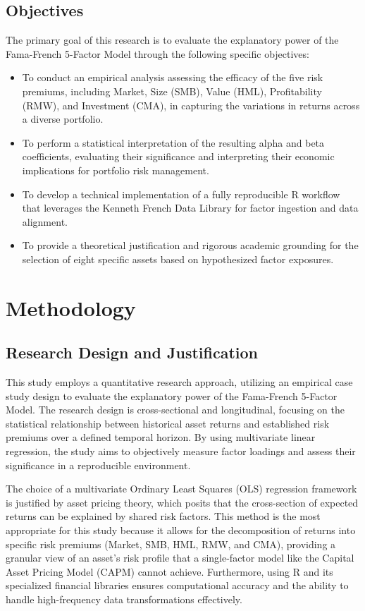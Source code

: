 \documentclass[12pt]{article}
\begin{document}
\subsection{Objectives}
The primary goal of this research is to evaluate the explanatory power of the Fama-French 5-Factor Model through the following specific objectives:
\begin{itemize}
    \item To conduct an empirical analysis assessing the efficacy of the five risk premiums, including Market, Size (SMB), Value (HML), Profitability (RMW), and Investment (CMA), in capturing the variations in returns across a diverse portfolio.
    \item To perform a statistical interpretation of the resulting alpha and beta coefficients, evaluating their significance and interpreting their economic implications for portfolio risk management.
    \item To develop a technical implementation of a fully reproducible R workflow that leverages the Kenneth French Data Library for factor ingestion and data alignment.
    \item To provide a theoretical justification and rigorous academic grounding for the selection of eight specific assets based on hypothesized factor exposures.
\end{itemize}

\section{Methodology}

\subsection{Research Design and Justification}
This study employs a quantitative research approach, utilizing an empirical case study design to evaluate the explanatory power of the Fama-French 5-Factor Model. The research design is cross-sectional and longitudinal, focusing on the statistical relationship between historical asset returns and established risk premiums over a defined temporal horizon. By using multivariate linear regression, the study aims to objectively measure factor loadings and assess their significance in a reproducible environment.

The choice of a multivariate Ordinary Least Squares (OLS) regression framework is justified by asset pricing theory, which posits that the cross-section of expected returns can be explained by shared risk factors. This method is the most appropriate for this study because it allows for the decomposition of returns into specific risk premiums (Market, SMB, HML, RMW, and CMA), providing a granular view of an asset's risk profile that a single-factor model like the Capital Asset Pricing Model (CAPM) cannot achieve. Furthermore, using R and its specialized financial libraries ensures computational accuracy and the ability to handle high-frequency data transformations effectively.
\end{document}
